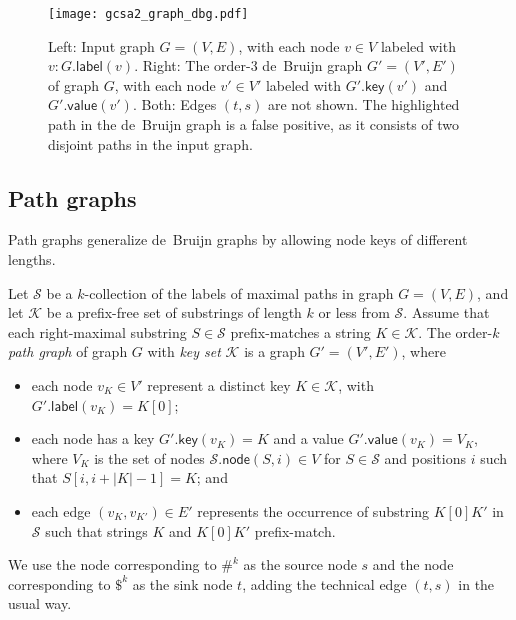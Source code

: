 \documentclass[a4paper,11pt]{llncs}
\newcommand{\abs}[1]{\ensuremath{\lvert #1 \rvert}}
\newcommand{\glabel}{\ensuremath{\mathsf{label}}}
\newcommand{\gkey}{\ensuremath{\mathsf{key}}}
\newcommand{\gvalue}{\ensuremath{\mathsf{value}}}
\newcommand{\gnode}{\ensuremath{\mathsf{node}}}
\newcommand{\kcollection}[1]{$#1$\nobreakdash-collection}
\newcommand{\orderk}[1]{order\nobreakdash-$#1$}
\begin{document}
\begin{figure}[t!]
\texttt{[image: gcsa2\_graph\_dbg.pdf]}
\caption{Left: Input graph $G = (V, E)$, with each node $v \in V$ labeled with $v:G.\glabel(v)$. Right: The \protect\orderk{3} de~Bruijn graph $G' = (V', E')$ of graph $G$, with each node $v' \in V'$ labeled with $G'.\gkey(v')$ and $G'.\gvalue(v')$. Both: Edges $(t, s)$ are not shown. The highlighted path in the de~Bruijn graph is a false positive, as it consists of two disjoint paths in the input graph.}\label{figure:graph-dbg}
\end{figure}

\subsection{Path graphs}

Path graphs generalize de~Bruijn graphs by allowing node keys of different lengths.

\begin{definition}
Let $\mathcal{S}$ be a \kcollection{k} of the labels of maximal paths in graph $G = (V, E)$, and let $\mathcal{K}$ be a prefix-free set of substrings of length $k$ or less from $\mathcal{S}$. Assume that each right-maximal substring $S \in \mathcal{S}$ prefix-matches a string $K \in \mathcal{K}$. The \orderk{k} \emph{path graph} of graph $G$ with \emph{key set} $\mathcal{K}$ is a graph $G' = (V', E')$, where
\begin{itemize}
\item each node $v_{K} \in V'$ represent a distinct key $K \in \mathcal{K}$, with $G'.\glabel(v_{K}) = K[0]$;
\item each node has a key $G'.\gkey(v_{K}) = K$ and a value $G'.\gvalue(v_{K}) = V_{K}$, where $V_{K}$ is the set of nodes $\mathcal{S}.\gnode(S, i) \in V$ for $S \in \mathcal{S}$ and positions $i$ such that $S[i, i+\abs{K}-1] = K$; and
\item each edge $(v_{K}, v_{K'}) \in E'$ represents the occurrence of substring $K[0] K'$ in $\mathcal{S}$ such that strings $K$ and $K[0] K'$ prefix-match.
\end{itemize}
We use the node corresponding to $\#^{k}$ as the source node $s$ and the node corresponding to $\$^{k}$ as the sink node $t$, adding the technical edge $(t, s)$ in the usual way.
\end{definition}
\end{document}
